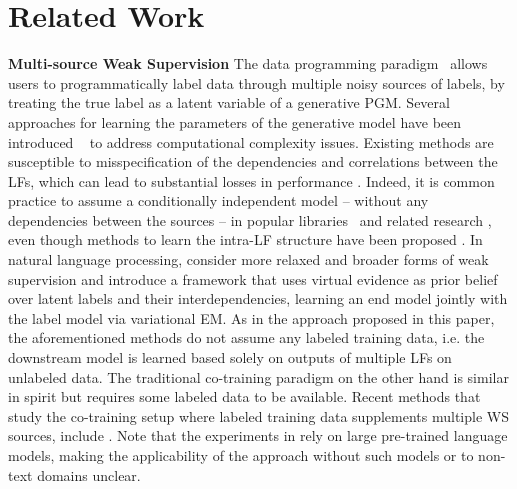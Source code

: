 \documentclass{article}
\begin{document}
\section{Related Work}
\label{RelatedWork}
\textbf{Multi-source Weak Supervision} 
The data programming paradigm~\cite{DP} allows users to programmatically label data through multiple noisy sources of labels, by treating the true label as a latent variable of a generative PGM.
Several approaches for learning the parameters of the generative model have been introduced ~\cite{Multitask, triplets, TripletsMean} to address computational complexity issues. 
Existing methods are susceptible to misspecification of the dependencies and correlations between the LFs, which can lead to substantial losses in performance \cite{MisspecificationInDP}. Indeed, it is common practice to assume a conditionally independent model -- without any dependencies between the sources -- in popular libraries~\cite{Drybell, Snorkel} and related research \cite{SkeneModel, anandkumar2014tensor, Snuba, IWS}, even though methods to learn the intra-LF structure have been proposed \cite{structureLearning1, structureLearning2, SL-static-analysis}. In natural language processing,  \cite{wang2018deep} consider more relaxed and broader forms of weak supervision and introduce a framework that uses virtual evidence as prior belief over latent
labels and their interdependencies, learning an end model jointly with the label model via variational EM. 
As in the approach proposed in this paper, the aforementioned methods do not assume any labeled training data, i.e. the downstream model is learned based solely on outputs of multiple LFs on unlabeled data.
The traditional co-training paradigm \cite{co_training} on the other hand is similar in spirit but requires some labeled data to be available. Recent methods that study the co-training setup where labeled training data supplements multiple WS sources, include \cite{Awasthi2020Learning,astra}.
Note that the experiments in \cite{Awasthi2020Learning, astra} rely on large pre-trained language models, making the applicability of the approach without such models or to non-text domains unclear.
\end{document}
